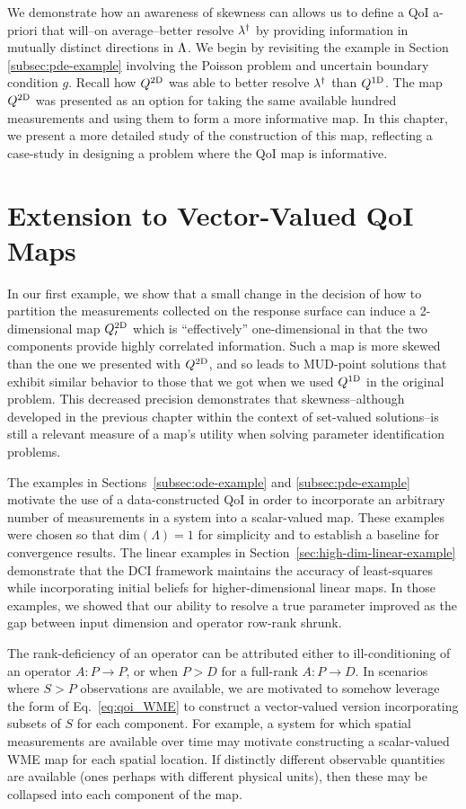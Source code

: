 
We demonstrate how an awareness of skewness can allows us to define a QoI a-priori that will\---on average\---better resolve $\lambda^\dagger$ by providing information in mutually distinct directions in ${\Lambda}$.
We begin by revisiting the example in Section \ref{subsec:pde-example} involving the Poisson problem and uncertain boundary condition $g$.
Recall how $Q^\text{2D}$ was able to better resolve $\lambda^\dagger$ than $Q^\text{1D}$.
The map $Q^\text{2D}$ was presented as an option for taking the same available hundred measurements and using them to form a more informative map.
In this chapter, we present a more detailed study of the construction of this map, reflecting a case-study in designing a problem where the QoI map is informative.

\section{Extension to Vector-Valued QoI Maps}
In our first example, we show that a small change in the decision of how to partition the measurements collected on the response surface can induce a 2-dimensional map $Q^\text{2D}_\prime$ which is ``effectively'' one-dimensional in that the two components provide highly correlated information.
Such a map is more skewed than the one we presented with $Q^\text{2D}$, and so leads to MUD-point solutions that exhibit similar behavior to those that we got when we used $Q^\text{1D}$ in the original problem.
This decreased precision demonstrates that skewness\---although developed in the previous chapter within the context of set-valued solutions\---is still a relevant measure of a map's utility when solving parameter identification problems.

The examples in Sections~\ref{subsec:ode-example} and \ref{subsec:pde-example} motivate the use of a data-constructed QoI in order to incorporate an arbitrary number of measurements in a system into a scalar-valued map.
These examples were chosen so that $\text{dim}({\Lambda}) = 1$ for simplicity and to establish a baseline for convergence results.
The linear examples in Section~\ref{sec:high-dim-linear-example} demonstrate that the DCI framework maintains the accuracy of least-squares while incorporating initial beliefs for higher-dimensional linear maps.
In those examples, we showed that our ability to resolve a true parameter improved as the gap between input dimension and operator row-rank shrunk.

The rank-deficiency of an operator can be attributed either to ill-conditioning of an operator $A:P\to P$, or when $P>D$ for a full-rank $A:P\to D$.
In scenarios where $S>P$ observations are available, we are motivated to somehow leverage the form of Eq.~\eqref{eq:qoi_WME} to construct a vector-valued version incorporating subsets of $S$ for each component.
For example, a system for which spatial measurements are available over time may motivate constructing a scalar-valued WME map for each spatial location.
If distinctly different observable quantities are available (ones perhaps with different physical units), then these may be collapsed into each component of the map.

